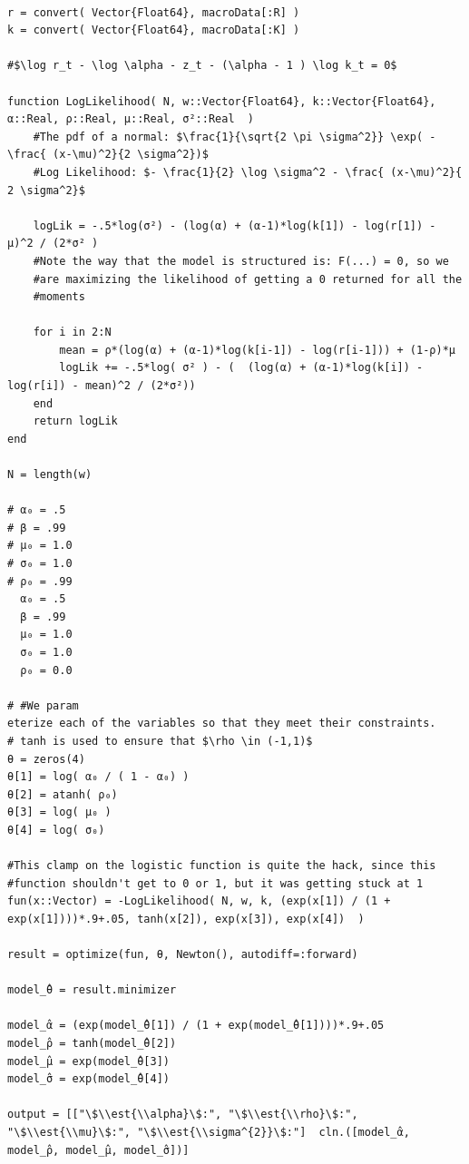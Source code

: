 \documentclass[12pt, letterpaper]{paper}
\begin{document}
\begin{verbatim}

r = convert( Vector{Float64}, macroData[:R] )
k = convert( Vector{Float64}, macroData[:K] )

#$\log r_t - \log \alpha - z_t - (\alpha - 1 ) \log k_t = 0$

function LogLikelihood( N, w::Vector{Float64}, k::Vector{Float64}, α::Real, ρ::Real, μ::Real, σ²::Real  )
    #The pdf of a normal: $\frac{1}{\sqrt{2 \pi \sigma^2}} \exp( - \frac{ (x-\mu)^2}{2 \sigma^2})$
    #Log Likelihood: $- \frac{1}{2} \log \sigma^2 - \frac{ (x-\mu)^2}{ 2 \sigma^2}$

    logLik = -.5*log(σ²) - (log(α) + (α-1)*log(k[1]) - log(r[1]) - μ)^2 / (2*σ² )
    #Note the way that the model is structured is: F(...) = 0, so we
    #are maximizing the likelihood of getting a 0 returned for all the
    #moments

    for i in 2:N
        mean = ρ*(log(α) + (α-1)*log(k[i-1]) - log(r[i-1])) + (1-ρ)*μ
        logLik += -.5*log( σ² ) - (  (log(α) + (α-1)*log(k[i]) - log(r[i]) - mean)^2 / (2*σ²))
    end
    return logLik
end

N = length(w)

# α₀ = .5
# β = .99
# μ₀ = 1.0
# σ₀ = 1.0
# ρ₀ = .99
  α₀ = .5
  β = .99
  μ₀ = 1.0
  σ₀ = 1.0
  ρ₀ = 0.0

# #We param
eterize each of the variables so that they meet their constraints.
# tanh is used to ensure that $\rho \in (-1,1)$
θ = zeros(4)
θ[1] = log( α₀ / ( 1 - α₀) )
θ[2] = atanh( ρ₀)
θ[3] = log( μ₀ )
θ[4] = log( σ₀)

#This clamp on the logistic function is quite the hack, since this
#function shouldn't get to 0 or 1, but it was getting stuck at 1
fun(x::Vector) = -LogLikelihood( N, w, k, (exp(x[1]) / (1 + exp(x[1])))*.9+.05, tanh(x[2]), exp(x[3]), exp(x[4])  )

result = optimize(fun, θ, Newton(), autodiff=:forward)

model_̂θ = result.minimizer

model_̂α = (exp(model_̂θ[1]) / (1 + exp(model_̂θ[1])))*.9+.05
model_̂ρ = tanh(model_̂θ[2])
model_̂μ = exp(model_̂θ[3])
model_̂σ = exp(model_̂θ[4])

output = [["\$\\est{\\alpha}\$:", "\$\\est{\\rho}\$:", "\$\\est{\\mu}\$:", "\$\\est{\\sigma^{2}}\$:"]  cln.([model_̂α, model_̂ρ, model_̂μ, model_̂σ])]
\end{verbatim}
\end{document}
